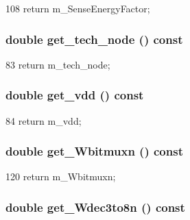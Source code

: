 \begin{DoxyCode}
108 { return m_SenseEnergyFactor; }
\end{DoxyCode}
\hypertarget{classTechParameter_a4f7f80eca67058bf81ffce3a3c9371f5}{
\subsubsection[{get\_\-tech\_\-node}]{\setlength{\rightskip}{0pt plus 5cm}double get\_\-tech\_\-node () const}}
\label{classTechParameter_a4f7f80eca67058bf81ffce3a3c9371f5}



\begin{DoxyCode}
83 { return m_tech_node; }
\end{DoxyCode}
\hypertarget{classTechParameter_a7e62d136a4e89f12981ce9fedac950f8}{
\subsubsection[{get\_\-vdd}]{\setlength{\rightskip}{0pt plus 5cm}double get\_\-vdd () const}}
\label{classTechParameter_a7e62d136a4e89f12981ce9fedac950f8}



\begin{DoxyCode}
84 { return m_vdd; }
\end{DoxyCode}
\hypertarget{classTechParameter_aa7d454b609fde3cd37caf2950f96d4f8}{
\subsubsection[{get\_\-Wbitmuxn}]{\setlength{\rightskip}{0pt plus 5cm}double get\_\-Wbitmuxn () const}}
\label{classTechParameter_aa7d454b609fde3cd37caf2950f96d4f8}



\begin{DoxyCode}
120 { return m_Wbitmuxn; }
\end{DoxyCode}
\hypertarget{classTechParameter_aa37a3e433e3819ca1be24020459b8a3f}{
\subsubsection[{get\_\-Wdec3to8n}]{\setlength{\rightskip}{0pt plus 5cm}double get\_\-Wdec3to8n () const}}
\label{classTechParameter_aa37a3e433e3819ca1be24020459b8a3f}



